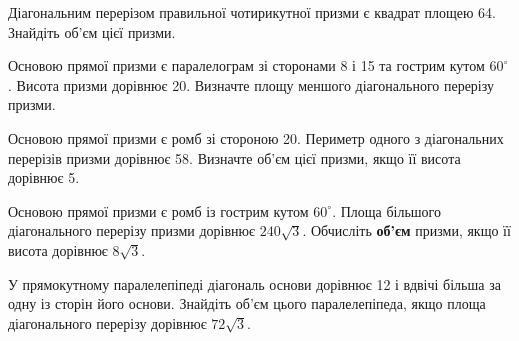 \documentclass[12pt]{article}
\begin{document}
\begin{samepage}
\noindent\zadnum Діагональним перерізом правильної чотирикутної призми є квадрат площею 64. Знайдіть об’єм цієї призми. 

\nmtnobreak
\nopagebreak\nbvspace{0.5cm}
\nmtAnswerBox
\par{}
\end{samepage}

\begin{samepage}
\noindent\zadnum Основою прямої призми є паралелограм зі сторонами 8 і 15 та гострим кутом $60^\circ$. Висота призми дорівнює 20. Визначте площу меншого діагонального перерізу призми. 

\nmtnobreak
\nopagebreak\nbvspace{0.5cm}
\nmtAnswerBox
\par{}
\end{samepage}

\begin{samepage}
\noindent\zadnum Основою прямої призми є ромб зі стороною 20. Периметр одного з діагональних перерізів призми дорівнює 58. Визначте об’єм цієї призми, якщо її висота дорівнює 5. 

\nmtnobreak
\nopagebreak\nbvspace{0.5cm}
\nmtAnswerBox
\par{}
\end{samepage}

\begin{samepage}
\noindent\zadnum Основою прямої призми є ромб із гострим кутом $60^\circ$. Площа більшого діагонального перерізу призми дорівнює $240\sqrt{3}$. Обчисліть \textbf{об’єм} призми, якщо її висота дорівнює $8\sqrt{3}$. 

\nmtnobreak
\nopagebreak\nbvspace{0.5cm}
\nmtAnswerBox
\nopagebreak\nbvspace{0.5cm}
\par{}\vspace{0.25cm}
\end{samepage}

\begin{samepage}
\noindent\zadnum У прямокутному паралелепіпеді діагональ основи дорівнює 12 і вдвічі більша за одну із сторін його основи. Знайдіть об’єм цього паралелепіпеда, якщо площа діагонального перерізу дорівнює $72\sqrt{3}$. 

\nmtnobreak
\nopagebreak\nbvspace{0.5cm}
\nmtAnswerBox
\par{}
\end{samepage}
\end{document}
